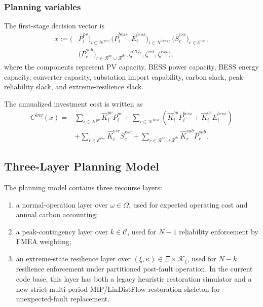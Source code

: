 \subsubsection{Planning variables}

The first-stage decision vector is
\begin{align}
x := \Big(
&\overline P_i^{pv}\big)_{i\in\mathcal{N}^{pv}},
\big(\overline P_i^{bess},\overline E_i^{bess}\big)_{i\in\mathcal{N}^{bess}},
\big(\overline S_c^{vsc}\big)_{c\in\mathcal{E}^{vsc}}, \\
&\big(\overline P_r^{sub}\big)_{r\in\mathcal{R}^{ac}\cup\mathcal{R}^{dc}},
\zeta^{CO_2},\zeta^{rel},\zeta^{ext}
\Big),
\end{align}
where the components represent PV capacity, BESS power capacity, BESS energy capacity, converter capacity, substation import capability, carbon slack, peak-reliability slack, and extreme-resilience slack.

The annualized investment cost is written as
\begin{align}
C^{inv}(x) =
&\sum_{i\in\mathcal{N}^{pv}} \widehat K_i^{pv}\overline P_i^{pv}
+ \sum_{i\in\mathcal{N}^{bess}} \left(\widehat K_i^{bp}\overline P_i^{bess} + \widehat K_i^{be}\overline E_i^{bess}\right) \\
&+ \sum_{c\in\mathcal{E}^{vsc}} \widehat K_c^{vsc}\overline S_c^{vsc}
+ \sum_{r\in\mathcal{R}^{ac}\cup\mathcal{R}^{dc}} \widehat K_r^{sub}\overline P_r^{sub}.
\label{eq:10b-investment-cost}
\end{align}

\subsection{Three-Layer Planning Model}

The planning model contains three recourse layers:
\begin{enumerate}
  \item a normal-operation layer over \(\omega\in\Omega\), used for expected operating cost and annual carbon accounting;
  \item a peak-contingency layer over \(k\in\mathcal{C}\), used for \(N{-}1\) reliability enforcement by FMEA weighting;
  \item an extreme-state resilience layer over \((\xi,\kappa)\in\Xi\times\mathcal{K}_\xi\), used for \(N{-}k\) resilience enforcement under partitioned post-fault operation. In the current code base, this layer has both a legacy heuristic restoration simulator and a new strict multi-period MIP/LinDistFlow restoration skeleton for unexpected-fault replacement.
\end{enumerate}

